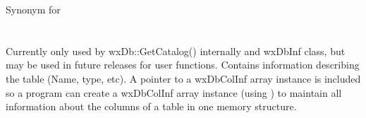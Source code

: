 \label{wxdbtableminusminus}


Synonym for 




\section{}\label{wxdbtableinf}

Currently only used by wxDb::GetCatalog() internally and wxDbInf class,
but may be used in future releases for  user functions.  Contains information
describing the table (Name, type, etc). A pointer to a wxDbColInf array 
instance is included so a program can create a wxDbColInf array instance
(using ) to maintain all information about the columns
of a table in one memory structure.


